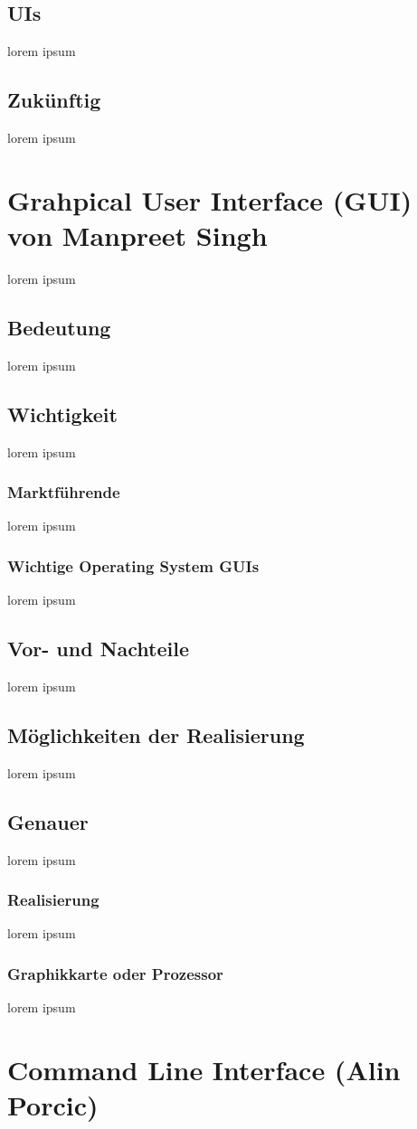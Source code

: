 \documentclass[12pt,a4paper]{report}
\begin{document}
\subsection{UIs}
lorem ipsum 
\subsection{Zukünftig}
lorem ipsum 
\section{Grahpical User Interface (GUI) von Manpreet Singh}
lorem ipsum
\subsection{Bedeutung}
lorem ipsum
\subsection{Wichtigkeit}
lorem ipsum
\subsubsection{Marktführende}
lorem ipsum
\subsubsection{Wichtige Operating System GUIs}
lorem ipsum
\subsection{Vor- und Nachteile}
lorem ipsum
\subsection{Möglichkeiten der Realisierung}
lorem ipsum
\subsection{Genauer}
lorem ipsum
\subsubsection{Realisierung}
lorem ipsum
\subsubsection{Graphikkarte oder Prozessor}
lorem ipsum
\newpage
\section{Command Line Interface (Alin Porcic)}
\end{document}
